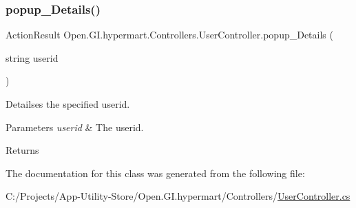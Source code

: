 \subsubsection{\texorpdfstring{popup\+\_\+\+Details()}{popup\_Details()}}
{\footnotesize\ttfamily Action\+Result Open.\+G\+I.\+hypermart.\+Controllers.\+User\+Controller.\+popup\+\_\+\+Details (\begin{DoxyParamCaption}\item[{string}]{userid }\end{DoxyParamCaption})}



Detailses the specified userid. 


\begin{DoxyParams}{Parameters}
{\em userid} & The userid.\\
\hline
\end{DoxyParams}
\begin{DoxyReturn}{Returns}

\end{DoxyReturn}


The documentation for this class was generated from the following file\+:\begin{DoxyCompactItemize}
\item 
C\+:/\+Projects/\+App-\/\+Utility-\/\+Store/\+Open.\+G\+I.\+hypermart/\+Controllers/\hyperlink{_user_controller_8cs}{User\+Controller.\+cs}\end{DoxyCompactItemize}
